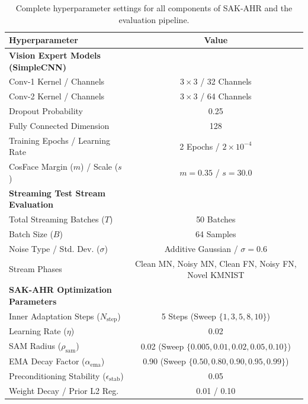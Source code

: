\documentclass{article}
\theoremstyle{plain}
\theoremstyle{definition}
\theoremstyle{remark}
\begin{document}
\begin{table}[H]
\caption{Complete hyperparameter settings for all components of SAK-AHR and the evaluation pipeline.}
\label{tab:hyperparams}
\vskip 0.15in
\begin{center}
\begin{small}
\begin{tabular}{lc}
\toprule
Hyperparameter & Value \\
\midrule
\textbf{Vision Expert Models (SimpleCNN)} & \\
Conv-1 Kernel / Channels & $3 \times 3$ / 32 Channels \\
Conv-2 Kernel / Channels & $3 \times 3$ / 64 Channels \\
Dropout Probability & 0.25 \\
Fully Connected Dimension & 128 \\
Training Epochs / Learning Rate & 2 Epochs / $2 \times 10^{-4}$ \\
CosFace Margin ($m$) / Scale ($s$) & $m = 0.35$ / $s = 30.0$ \\
\midrule
\textbf{Streaming Test Stream Evaluation} & \\
Total Streaming Batches ($T$) & 50 Batches \\
Batch Size ($B$) & 64 Samples \\
Noise Type / Std. Dev. ($\sigma$) & Additive Gaussian / $\sigma = 0.6$ \\
Stream Phases & Clean MN, Noisy MN, Clean FN, Noisy FN, Novel KMNIST \\
\midrule
\textbf{SAK-AHR Optimization Parameters} & \\
Inner Adaptation Steps ($N_{\text{step}}$) & 5 Steps (Sweep $\{1, 3, 5, 8, 10\}$) \\
Learning Rate ($\eta$) & 0.02 \\
SAM Radius ($\rho_{\text{sam}}$) & 0.02 (Sweep $\{0.005, 0.01, 0.02, 0.05, 0.10\}$) \\
EMA Decay Factor ($\alpha_{\text{ema}}$) & 0.90 (Sweep $\{0.50, 0.80, 0.90, 0.95, 0.99\}$) \\
Preconditioning Stability ($\epsilon_{\text{stab}}$) & 0.05 \\
Weight Decay / Prior L2 Reg. & 0.01 / 0.10 \\
\bottomrule
\end{tabular}
\end{small}
\end{center}
\vskip -0.1in
\end{table}
\end{document}
